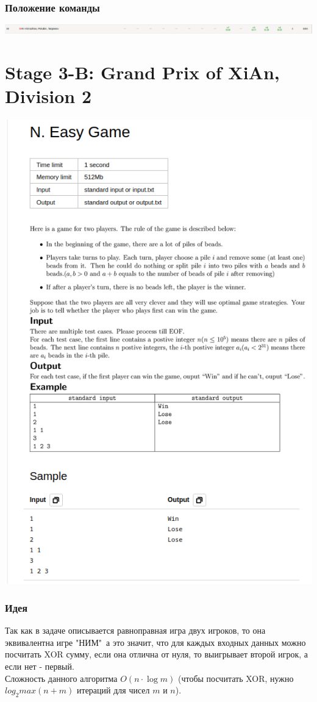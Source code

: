 \documentclass[12pt]{article}
\begin{document}
\subsubsection*{Положение команды}
\includegraphics[scale=0.5]{images/2.png}\newline\noindent

\pagebreak
\section{Stage 3-B: Grand Prix of XiAn, Division 2}
\includegraphics[scale=0.75]{statements/3_N.png}
\subsubsection*{Идея}
Так как в задаче описывается равноправная игра двух игроков, то она 
\\эквивалентна игре "НИМ"\, а это значит, что
для каждых входных данных можно посчитать XOR сумму, если она отлична от нуля, то выигрывает второй игрок, а если нет - первый.
\\ 
Сложность данного алгоритма $O(n \cdot \log{m})$ (чтобы посчитать XOR, нужно $log_2{max(n+m)}$ итераций для чисел $m$ и $n$).
\end{document}
